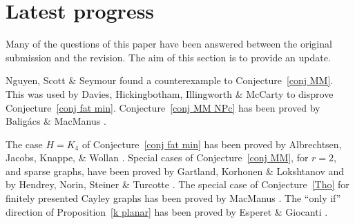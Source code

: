 \documentclass[a4paper]{article}
\newcommand{\Prr}[1]{Pro\-position~\ref{#1}}
\newcommand{\Cnr}[1]{Con\-jecture~\ref{#1}}
\begin{document}
\section{Latest progress}
Many of the questions of this paper have been answered between the original submission and the revision. The aim of this section is to provide an update.

Nguyen, Scott \& Seymour \cite{NgScSeCou} found  a counterexample to \Cnr{conj MM}. This was used by Davies, Hickingbotham,  Illingworth \& McCarty \cite{DHIM} to disprove \Cnr{conj fat min}. \Cnr{conj MM NPc} has been proved by Balig\'acs \& MacManus \cite{BalMcMmet}.

The case $H=K_4$ of  \Cnr{conj fat min} has been proved by Albrechtsen, Jacobs,  Knappe, \& Wollan \cite{AJKW}. Special cases of \Cnr{conj MM}, for $r=2$, and sparse graphs, have been proved by Gartland, Korhonen \& Lokshtanov \cite{GaKoLo} and by Hendrey, Norin, Steiner \& Turcotte \cite{HNST}.
The special case of \Cnr{Tho} for finitely presented Cayley graphs has been proved by MacManus \cite{McMFat}. The “only if” direction of \Prr{k planar} has been proved by Esperet \& Giocanti \cite{EsGiCoa}.






\end{document}
